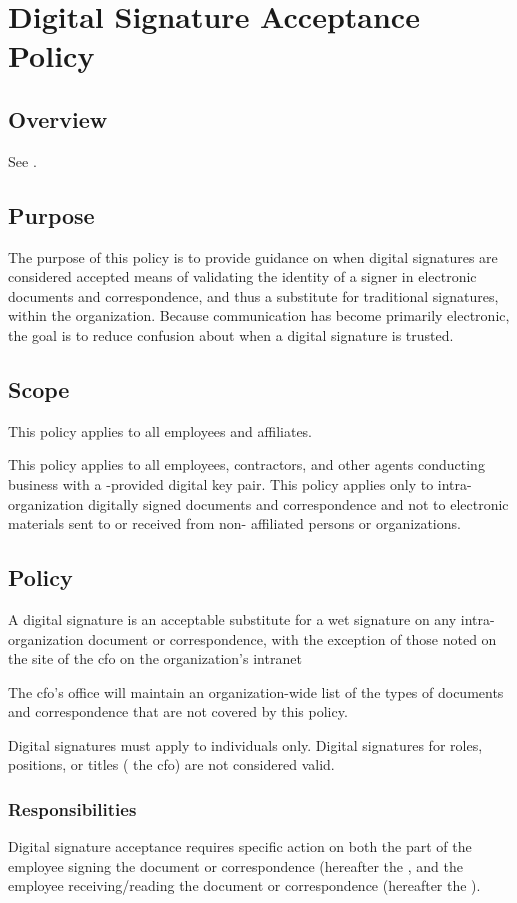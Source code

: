 \chapter{Digital Signature Acceptance Policy}
\CommonIntroduction
\section{Overview}
See .
\section{Purpose}\label{g:dsap:p}
The purpose of this policy is to provide guidance on when digital signatures are considered accepted means of validating the identity of a signer in \CompanyName{} electronic documents and correspondence, and thus a substitute for traditional  signatures, within the organization.  
Because communication has become primarily electronic, the goal is to reduce confusion about when a digital signature is trusted.
\section{Scope}
This policy applies to all \CompanyName{} employees and affiliates.  

This policy applies to all \CompanyName{} employees, contractors, and other agents conducting \CompanyName{} business with a \CompanyName{}-provided digital key pair.  
This policy applies only to intra-organization digitally signed documents and correspondence and not to electronic materials sent to or received from non-\CompanyName{} affiliated persons or organizations.
\section{Policy}
A digital signature is an acceptable substitute for a wet signature on any intra-organization document or correspondence, with the exception of those noted on the site of the \gls{cfo} on the organization's intranet

The \gls{cfo}'s office will maintain an organization-wide list of the types of documents and correspondence that are not covered by this policy.

Digital signatures must apply to individuals only.  
Digital signatures for roles, positions, or titles (\eg{} the \gls{cfo}) are not considered valid.
\subsection{Responsibilities}
Digital signature acceptance requires specific action on both the part of the employee signing the document or correspondence (hereafter the , and the employee receiving/reading the document or correspondence (hereafter the ).
